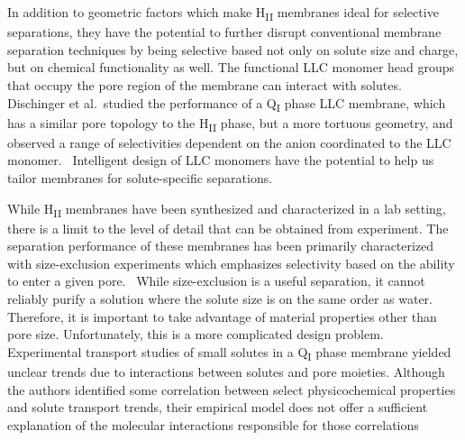 \documentclass[journal=jpcbfk,manuscript=article]{achemso}
\begin{document}
  In addition to geometric factors which make H\textsubscript{II} membranes
  ideal for selective separations, they have the potential to further disrupt
  conventional membrane separation techniques by being selective based not
  only on solute size and charge, but on chemical functionality as well. 
  The functional LLC monomer head groups that occupy the pore region of the
  membrane can interact with solutes. Dischinger et al.~studied the 
  performance of a Q\textsubscript{I} phase LLC membrane, which has a 
  similar pore topology to the H\textsubscript{II} phase, but a more 
  tortuous geometry, and observed a range of selectivities dependent on the
  anion coordinated to the LLC monomer.~\cite{dischinger_effect_2017} Intelligent 
  design of LLC monomers have the potential to help us tailor membranes for 
  solute-specific separations.

  While H\textsubscript{II} membranes have been synthesized and characterized
  in a lab setting, there is a limit to the level of detail that can be obtained 
  from experiment. 
  The separation performance of these membranes has been 
  primarily characterized with size-exclusion experiments which emphasizes 
  selectivity based on the ability to enter a given pore.~\cite{zhou_supported_2005}
  While size-exclusion is a useful separation, it 
  cannot reliably purify a solution where the solute size is on the same order as water. Therefore, it is
  important to take advantage of material properties other than pore size. 
  Unfortunately, this is a more complicated design problem. Experimental transport
  studies of small solutes in a Q\textsubscript{I} phase membrane yielded 
  unclear trends due to interactions between solutes and pore moieties. Although
  the authors identified some correlation between select physicochemical properties
  and solute transport trends, their empirical model does not offer a sufficient 
  explanation of the molecular interactions responsible for those correlations~\cite{dischinger_effect_2017}
\end{document}
